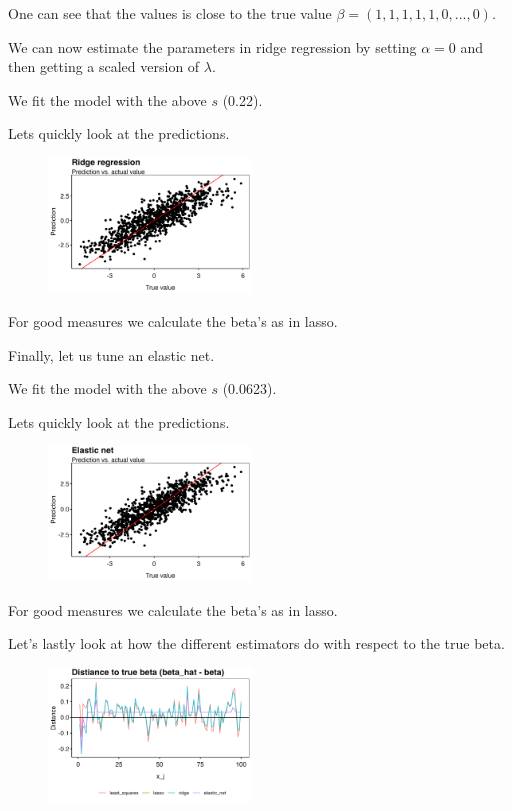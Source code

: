 \documentclass[
]{book}
\begin{document}
One can see that the values is close to the true value \(\beta=(1,1,1,1,1,0,...,0)\).

We can now estimate the parameters in ridge regression by setting \(\alpha = 0\) and then getting a scaled version of \(\lambda\).

We fit the model with the above \(s\) (0.22).

Lets quickly look at the predictions.

\begin{figure}[H]
  \begin{center}
    \includegraphics[width=0.48\textwidth]{figures/ML_week2_ex1_03.png}
  \end{center}
\end{figure}

For good measures we calculate the beta's as in lasso.

Finally, let us tune an elastic net.

We fit the model with the above \(s\) (0.0623).

Lets quickly look at the predictions.

\begin{figure}[H]
  \begin{center}
    \includegraphics[width=0.48\textwidth]{figures/ML_week2_ex1_04.png}
  \end{center}
\end{figure}

For good measures we calculate the beta's as in lasso.

Let's lastly look at how the different estimators do with respect to the true beta.

\begin{figure}[H]
  \begin{center}
    \includegraphics[width=0.48\textwidth]{figures/ML_week2_ex1_05.png}
  \end{center}
\end{figure}
\end{document}
